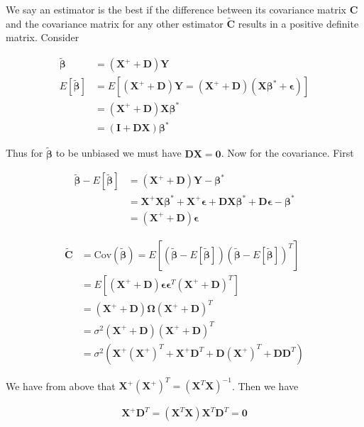 \documentclass[12pt]{article}
\newcommand{\ep}{\epsilon}
\newcommand{\bv}[1]{\boldsymbol{#1}}
\begin{document}
We say an estimator is the best if the difference between its covariance matrix $\bv{C}$ and the covariance matrix for any other estimator $\bv{\tilde{C}}$ results in a positive definite matrix. 
Consider

\begin{align}
\bv{\tilde{\beta}} &= (\bv{X}^+ + \bv{D})\bv{Y}\\
E\left[\bv{\tilde{\beta}}\right] &= E\left[(\bv{X}^+ + \bv{D})\bv{Y} = (\bv{X}^+ + \bv{D})(\bv{X}\bv{\beta^*}+\bv{\ep})\right]\\
&= (\bv{X}^+ + \bv{D})\bv{X}\bv{\beta^*}\\
&= (\bv{I} + \bv{D}\bv{X})\bv{\beta^*}
\end{align}

Thus for $\bv{\tilde{\beta}}$ to be unbiased we must have $\bv{D}\bv{X} = \bv{0}$. Now for the covariance. First 

\begin{align}
\bv{\tilde{\beta}} - E\left[\bv{\tilde{\beta}}\right] &= (\bv{X}^+ + \bv{D})\bv{Y} - \bv{\beta^*}\\
&= \bv{X}^+\bv{X}\bv{\beta^*} + \bv{X}^+ \bv{\ep} + \bv{D}\bv{X}\bv{\beta^*} + \bv{D}\bv{\ep} - \bv{\beta^*}\\
&= (\bv{X}^+ + \bv{D})\bv{\ep}
\end{align}

\begin{align}
\bv{\tilde{C}} &= \text{Cov}(\bv{\tilde{\beta}}) = E\left[\left(\bv{\tilde{\beta}} - E\left[\bv{\tilde{\beta}}\right]\right)\left(\bv{\tilde{\beta}} - E\left[\bv{\tilde{\beta}}\right]\right)^T\right]\\
&=E\left[\left(\bv{X}^+ + \bv{D}\right) \bv{\ep}\bv{\ep}^T \left(\bv{X}^+ + \bv{D}\right)^T \right]\\
&= \left(\bv{X}^+ + \bv{D}\right) \bv{\Omega} \left(\bv{X}^+ + \bv{D}\right)^T\\
&= \sigma^2 \left(\bv{X}^+ + \bv{D}\right) \left(\bv{X}^+ + \bv{D}\right)^T\\
&= \sigma^2 \left(\bv{X}^+(\bv{X}^+)^T + \bv{X}^+ \bv{D}^T + \bv{D}(\bv{X}^+)^T +\bv{D}\bv{D}^T \right)
\end{align}

We have from above that $\bv{X}^+(\bv{X}^+)^T = (\bv{X}^T\bv{X})^{-1}$. Then we have

\begin{align}
\bv{X}^+\bv{D}^T = (\bv{X}^T\bv{X})\bv{X}^T\bv{D}^T = \bv{0}
\end{align}
\end{document}
